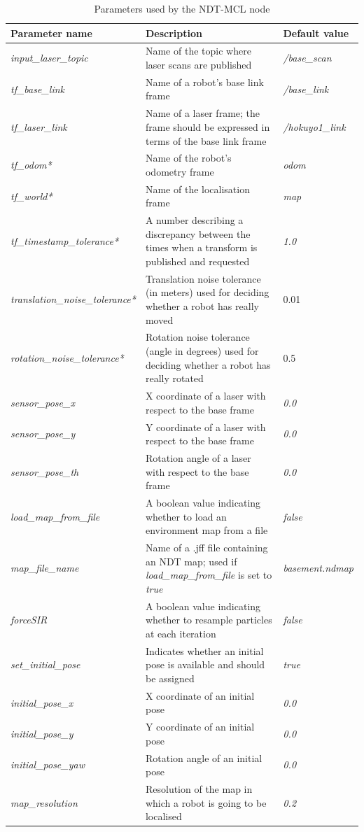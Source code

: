\documentclass[12pt]{article}
\begin{document}
		\begin{longtable}{| p{4.7cm} | p{7.2cm} | p{3.3cm} |}
			\caption{Parameters used by the NDT-MCL node} \\\hline
			{\bf Parameter name} & {\bf Description} & {\bf Default value} \\\hline
			{\it input\_laser\_topic} & Name of the topic where laser scans are published & {\it /base\_scan} \\\hline
			{\it tf\_base\_link} & Name of a robot's base link frame & {\it /base\_link} \\\hline
			{\it tf\_laser\_link} & Name of a laser frame; the frame should be expressed in terms of the base link frame & {\it /hokuyo1\_link} \\\hline
			{\it tf\_odom*} & Name of the robot's odometry frame & {\it odom} \\\hline
			{\it tf\_world*} & Name of the localisation frame & {\it map} \\\hline
			{\it tf\_timestamp\_tolerance*} & A number describing a discrepancy between the times when a transform is published and requested & {\it 1.0} \\\hline
			{\it translation\_noise\_tolerance*} & Translation noise tolerance (in meters) used for deciding whether a robot has really moved & 0.01 \\\hline
			{\it rotation\_noise\_tolerance*} & Rotation noise tolerance (angle in degrees) used for deciding whether a robot has really rotated & 0.5 \\\hline
			{\it sensor\_pose\_x} & X coordinate of a laser with respect to the base frame & {\it 0.0} \\\hline
			{\it sensor\_pose\_y} & Y coordinate of a laser with respect to the base frame & {\it 0.0} \\\hline
			{\it sensor\_pose\_th} & Rotation angle of a laser with respect to the base frame & {\it 0.0} \\\hline
			{\it load\_map\_from\_file} & A boolean value indicating whether to load an environment map from a file & {\it false} \\\hline
			{\it map\_file\_name} & Name of a .jff file containing an NDT map; used if {\it load\_map\_from\_file} is set to {\it true} & {\it basement.ndmap} \\\hline
			{\it forceSIR} & A boolean value indicating whether to resample particles at each iteration & {\it false} \\\hline
			{\it set\_initial\_pose} & Indicates whether an initial pose is available and should be assigned & {\it true} \\\hline
			{\it initial\_pose\_x} & X coordinate of an initial pose & {\it 0.0} \\\hline
			{\it initial\_pose\_y} & Y coordinate of an initial pose & {\it 0.0} \\\hline
			{\it initial\_pose\_yaw} & Rotation angle of an initial pose & {\it 0.0} \\\hline
			{\it map\_resolution} & Resolution of the map in which a robot is going to be localised & {\it 0.2} \\\hline
		\end{longtable}
\end{document}
